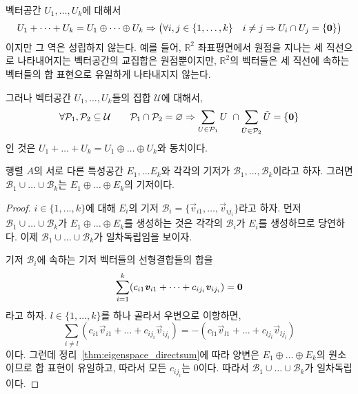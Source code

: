 \documentclass[sections/engineering_mathematics_lecture_note.tex]{subfiles}
\begin{document}
\begin{remark}
    벡터공간 $U_1, \dots, U_k$에 대해서
    \begin{equation*}
        U_1 + \dots + U_k = U_1 \oplus \dots \oplus U_k \Rightarrow \bigl(\forall i, j \in \{1, \dots, k\}\quad i \neq j \Rightarrow U_i \cap U_j = \{\bm{\mathrm{0}}\}\bigr)
    \end{equation*}
    이지만 그 역은 성립하지 않는다.
    예를 들어, $\mathbb R^2$ 좌표평면에서 원점을 지나는 세 직선으로 나타내어지는 벡터공간의 교집합은 원점뿐이지만, $\mathbb R^2$의 벡터들은 세 직선에 속하는 벡터들의 합 표현으로 유일하게 나타내지지 않는다.

    그러나 벡터공간 $U_1, \dots, U_k$들의 집합 $\mathcal U$에 대해서,
    \begin{equation*}
        \forall \mathcal P_1, \mathcal P_2 \subseteq \mathcal U \qquad \mathcal P_1 \cap \mathcal P_2 = \varnothing \Rightarrow \sum_{U \in \mathcal P_1} U\ \cap \sum_{\tilde U \in \mathcal P_2} \tilde U = \{\bm{\mathrm{0}}\}
    \end{equation*}
    인 것은 $U_1 + \dots + U_k = U_1 \oplus \dots \oplus U_k$와 동치이다.
\end{remark}

\begin{theorem}
    행렬 $A$의 서로 다른 특성공간 $E_1, \dots E_k$와 각각의 기저가 $\mathcal B_1, \dots, \mathcal B_k$이라고 하자.
    그러면 $\mathcal B_1 \cup \dots \cup \mathcal B_k$는 $E_1 \oplus \dots \oplus E_k$의 기저이다.
\end{theorem}

\begin{proof}
    $i \in \{1, \dots, k\}$에 대해 $E_i$의 기저 $\mathcal B_i = \{\vec v_{i1}, \dots, \vec v_{ij_i}\}$라고 하자.
    먼저 $\mathcal B_1 \cup \dots \cup \mathcal B_k$가 $E_1 \oplus \dots \oplus E_k$를 생성하는 것은 각각의 $\mathcal B_i$가 $E_i$를 생성하므로 당연하다.
    이제 $\mathcal B_1 \cup \dots \cup \mathcal B_k$가 일차독립임을 보이자.

    기저 $\mathcal B_i$에 속하는 기저 벡터들의 선형결합들의 합을
    \begin{equation*}
        \sum_{i = 1}^k (c_{i1} \bm{\mathit{v}}_{i1} + \dots + c_{ij_i} \bm{\mathit{v}}_{ij_i}) = \bm{\mathrm{0}}
    \end{equation*}
    라고 하자.
    $l \in \{1, \dots, k\}$를 하나 골라서 우변으로 이항하면,
    \begin{equation*}
        \sum_{i \neq l} (c_{i1} \vec v_{i1} + \dots + c_{ij_i} \vec v_{ij_i}) = -(c_{l1} \vec v_{l1} + \dots + c_{lj_l} \vec v_{lj_l})
    \end{equation*}
    이다.
    그런데 정리~\ref{thm:eigenspace_directsum}에 따라 양변은 $E_1 \oplus \dots \oplus E_k$의 원소이므로 합 표현이 유일하고, 따라서 모든 $c_{ij_i}$는 0이다.
    따라서 $\mathcal B_1 \cup \dots \cup \mathcal B_k$가 일차독립이다.
\end{proof}
\end{document}

